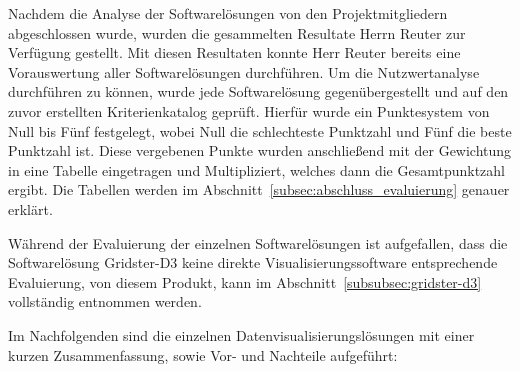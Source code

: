 {Nachdem die Analyse der Softwarelösungen von den Projektmitgliedern
abgeschlossen wurde, wurden die gesammelten Resultate Herrn Reuter zur
Verfügung gestellt. Mit diesen Resultaten konnte Herr Reuter bereits eine
Vorauswertung aller Softwarelösungen durchführen. Um die Nutzwertanalyse
durchführen zu können, wurde jede Softwarelösung gegenübergestellt und auf den
zuvor erstellten Kriterienkatalog geprüft. Hierfür wurde ein Punktesystem von
Null bis Fünf festgelegt, wobei Null die schlechteste Punktzahl und Fünf die
beste Punktzahl ist. Diese vergebenen Punkte wurden anschließend mit der
Gewichtung in eine Tabelle eingetragen und Multipliziert, welches dann die
Gesamtpunktzahl ergibt.  Die Tabellen werden im
Abschnitt~\ref{subsec:abschluss_evaluierung} genauer erklärt.

Während der Evaluierung der einzelnen Softwarelösungen ist aufgefallen, dass
die Softwarelösung Gridster\hyp{}D3 keine direkte Visualisierungssoftware
entsprechende Evaluierung, von diesem Produkt, kann im
Abschnitt~\ref{subsubsec:gridster-d3} vollständig entnommen werden.

Im Nachfolgenden sind die einzelnen Datenvisualisierungslösungen mit einer
kurzen Zusammenfassung, sowie Vor- und Nachteile aufgeführt:
\mr%

}
